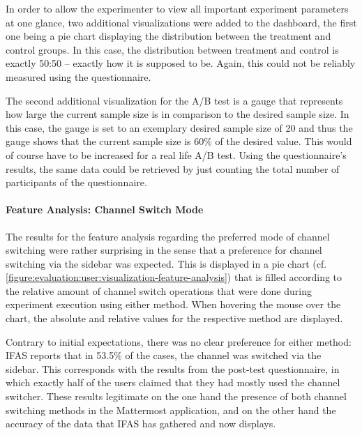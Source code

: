 In order to allow the experimenter to view all important experiment parameters at one glance, two additional visualizations were added to the dashboard, the first one being a pie chart displaying the distribution between the treatment and control groups.
In this case, the distribution between treatment and control is exactly 50:50 -- exactly how it is supposed to be.
Again, this could not be reliably measured using the questionnaire.

The second additional visualization for the A/B test is a gauge that represents how large the current sample size is in comparison to the desired sample size.
In this case, the gauge is set to an exemplary desired sample size of 20 and thus the gauge shows that the current sample size is 60\% of the desired value.
This would of course have to be increased for a real life A/B test.
Using the questionnaire's results, the same data could be retrieved by just counting the total number of participants of the questionnaire.


%
%
%
%


\paragraph{Feature Analysis: Channel Switch Mode} 

The results for the feature analysis regarding the preferred mode of channel switching were rather surprising in the sense that a preference for channel switching via the sidebar was expected.
This is displayed in a pie chart (cf. \cref{figure:evaluation:user:visualization-feature-analysis}) that is filled according to the relative amount of channel switch operations that were done during experiment execution using either method.
When hovering the mouse over the chart, the absolute and relative values for the respective method are displayed.

Contrary to initial expectations, there was no clear preference for either method: \ac{IFAS} reports that in 53.5\% of the cases, the channel was switched via the sidebar.
This corresponds with the results from the post-test questionnaire, in which exactly half of the users claimed that they had mostly used the channel switcher.
These results legitimate on the one hand the presence of both channel switching methods in the Mattermost application, and on the other hand the accuracy of the data that \ac{IFAS} has gathered and now displays.

